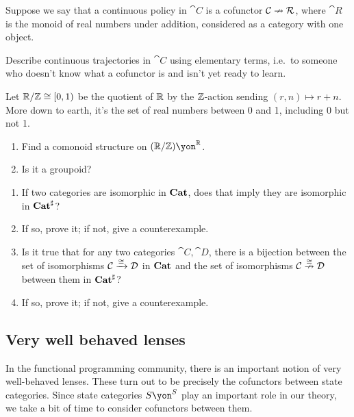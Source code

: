 \documentclass[Book-Poly]{subfiles}
\begin{document}
\begin{exercise}
Suppose we say that a continuous policy in $\cat{C}$ is a cofunctor $\mathcal{C}\nrightarrow\mathcal{R}$, where $\cat{R}$ is the monoid of real numbers under addition, considered as a category with one object. 

Describe continuous trajectories in $\cat{C}$ using elementary terms, i.e.\ to someone who doesn't know what a cofunctor is and isn't yet ready to learn.
\end{exercise}

\begin{exercise}
Let $\mathbb{R}/\mathbb{Z}\cong[0,1)$ be the quotient of $\mathbb{R}$ by the $\mathbb{Z}$-action sending $(r,n)\mapsto r+n$. More down to earth, it's the set of real numbers between 0 and 1, including 0 but not 1.%
\begin{enumerate}
	\item Find a comonoid structure on $(\rr/\zz)\yon^\rr$.
	\item Is it a groupoid?
\qedhere
\end{enumerate}
\end{exercise}

\begin{exercise}
\begin{enumerate}
	\item If two categories are isomorphic in $\mathbf{Cat}$, does that imply they are isomorphic in $\mathbf{Cat}^\sharp$?
	\item If so, prove it; if not, give a counterexample.
	\item Is it true that for any two categories $\cat{C},\cat{D}$, there is a bijection between the set of isomorphisms $\mathcal{C}\xrightarrow{\cong}\mathcal{D}$ in $\mathbf{Cat}$ and the set of isomorphisms $\mathcal{C}\overset{\cong}{\nrightarrow}\mathcal{D}$ between them in $\mathbf{Cat}^\sharp$?
	\item If so, prove it; if not, give a counterexample.
\qedhere
\end{enumerate}
\end{exercise}

\subsection{Very well behaved lenses}

In the functional programming community, there is an important notion of very well-behaved lenses. These turn out to be precisely the cofunctors between state categories. Since state categories $S\yon^S$ play an important role in our theory, we take a bit of time to consider cofunctors between them.
\end{document}

